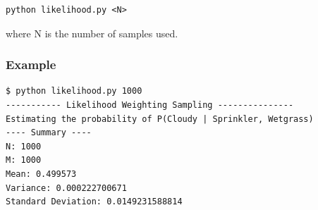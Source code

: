 \documentclass{article}
\begin{document}
\begin{lstlisting}
python likelihood.py <N>
\end{lstlisting}
where N is the number of samples used.\\

\subsubsection{Example}
\begin{lstlisting}
$ python likelihood.py 1000
----------- Likelihood Weighting Sampling ---------------
Estimating the probability of P(Cloudy | Sprinkler, Wetgrass)
---- Summary ----
N: 1000
M: 1000
Mean: 0.499573
Variance: 0.000222700671
Standard Deviation: 0.0149231588814

\end{lstlisting}
\end{document}
